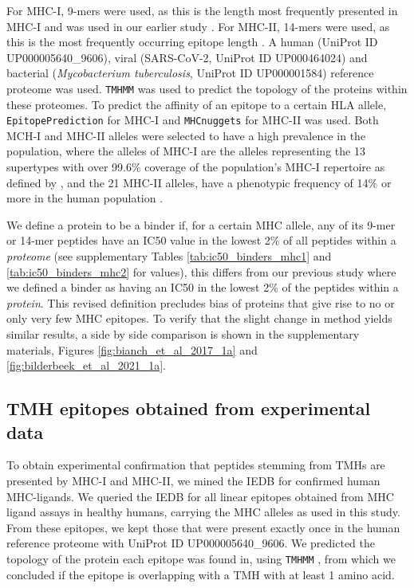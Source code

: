 For MHC-I, 9-mers were used, 
as this is the length most frequently presented in MHC-I 
and was used in our earlier study \cite{bianchi2017}. 
For MHC-II, 14-mers were used, 
as this is the most frequently occurring epitope length \cite{bergseng2015different}.
A human (UniProt ID UP000005640\_9606), 
viral (SARS-CoV-2, UniProt ID UP000464024) 
and bacterial (\emph{Mycobacterium tuberculosis}, UniProt ID UP000001584) 
reference proteome was used. 
\verb;TMHMM; \cite{krogh2001predicting} was used to predict the topology 
of the proteins within these proteomes.
To predict the affinity of an epitope to a certain HLA allele,
 \verb;EpitopePrediction; \cite{bianchi2017} for MHC-I 
and \verb;MHCnuggets; \cite{shao2020high} for MHC-II was used.
Both MCH-I and MHC-II alleles were selected 
to have a high prevalence in the population,
where the alleles of MHC-I are the alleles representing the 13 supertypes 
with over 99.6\% coverage of the population's MHC-I repertoire as defined by \cite{lund2004definition} \cite{sette1999},
and the 21 MHC-II alleles, have a phenotypic frequency 
of 14\% or more in the human population \cite{greenbaum2011functional}.
 
We define a protein to be a binder if, for a certain MHC allele, 
any of its 9-mer or 14-mer peptides have an IC50 value in the lowest 2\% of 
all peptides within a \emph{proteome} 
(see supplementary Tables \ref{tab:ic50_binders_mhc1} and \ref{tab:ic50_binders_mhc2} for values), 
this differs from our previous study where we defined
a binder as having an IC50 in the lowest 2\% 
of the peptides within a \emph{protein}.
This revised definition precludes bias of proteins 
that give rise to no or only very few MHC epitopes.
To verify that the slight change in method yields similar results,
a side by side comparison is shown in the supplementary materials, 
Figures \ref{fig:bianch_et_al_2017_1a} and \ref{fig:bilderbeek_et_al_2021_1a}.

\subsection{TMH epitopes obtained from experimental data}\label{subsec:elution_studies}

To obtain experimental confirmation that peptides stemming from TMHs 
are presented by MHC-I and MHC-II,
we mined the IEDB \cite{vita2019immune}
for confirmed human MHC-ligands.
We queried the IEDB for all linear epitopes obtained
from MHC ligand assays in healthy humans, 
carrying the MHC alleles as used in this study.
From these epitopes, we kept those that were present
exactly once in the human reference proteome
with UniProt ID UP000005640\_9606.
We predicted the topology of the protein each epitope
was found in, using \verb;TMHMM; \cite{krogh2001predicting},
from which we concluded if the epitope is overlapping with a TMH
with at least 1 amino acid.

